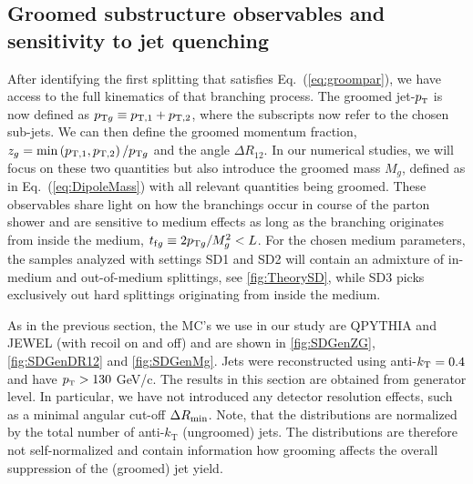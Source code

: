 \subsection{Groomed substructure observables and sensitivity to jet quenching}
\label{sec:groomedobservables}

After identifying the first splitting that satisfies Eq.~(\ref{eq:groompar}), we have access to the full kinematics of that branching process. The groomed jet-$p_{\text{\tiny T}}$ is now defined as $p_{{\rm \tiny T} g} \equiv p_{\mathrm{T},1}+p_{\mathrm{T},2}$, where the subscripts now refer to the chosen sub-jets. We can then define the groomed momentum fraction, $z_g = \min \left(p_{{\rm \tiny T},1},p_{{\rm \tiny T},2}\right)/p_{{\rm \tiny T}g}$ and the angle $\Delta R_{12}$. In our numerical studies, we will focus on these two quantities but also introduce the groomed mass $M_g$, defined as in Eq.~(\ref{eq:DipoleMass}) with all relevant quantities being groomed. These observables share light on how the branchings occur in course of the parton shower and are sensitive to medium effects as long as the branching originates from inside the medium, $ t_{{\rm f}g}\equiv 2 p_{{\rm \tiny T}g}/M_g^2 < L$. For the chosen medium parameters, the samples analyzed with settings SD1 and SD2 will contain an admixture of in-medium and out-of-medium splittings, see \autoref{fig:TheorySD}, while SD3 picks exclusively out hard splittings originating from inside the medium. 

As in the previous section, the MC's we use in our study are QPYTHIA and JEWEL (with recoil on and off) and are shown in \autoref{fig:SDGenZG}, \ref{fig:SDGenDR12} and \ref{fig:SDGenMg}. Jets were reconstructed using anti-$k_{\rm \tiny T}=0.4$ and have $p_{\text{\tiny T}} > 130$ GeV/c.
The results in this section are obtained from generator level. In particular, we have not introduced any detector resolution effects, such as a minimal angular cut-off $\Delta R_{\rm min}$.
Note, that the distributions are normalized by the total number of anti-$k_{\text{T}}$ (ungroomed) jets. The distributions are therefore not self-normalized and contain information how grooming affects the overall suppression of the (groomed) jet yield. 

